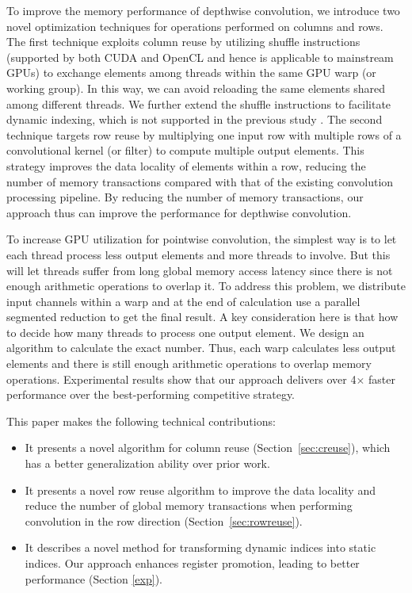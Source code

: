 To improve the memory performance of depthwise convolution, we introduce two novel optimization techniques for operations performed on columns and rows. 
The first technique exploits column reuse by utilizing shuffle instructions (supported by both CUDA and OpenCL and hence is applicable to mainstream GPUs) to exchange elements among threads within the same GPU warp (or working group). 
In this way, we can avoid reloading the same elements shared among different threads. 
We further extend the shuffle instructions to facilitate dynamic indexing, which is not supported in the previous study \cite{vasilache2014fast}. 
The second technique targets row reuse by multiplying one input row with multiple rows of a convolutional kernel (or filter) to compute multiple output elements. 
This strategy improves the data locality of elements within a row, reducing the number of memory transactions compared with that of the
existing convolution processing pipeline. 
By reducing the number of memory transactions, our approach thus can improve the performance for depthwise convolution.

To increase GPU utilization for pointwise convolution, the simplest way is to let each thread process less output elements and more threads to involve. 
But this will let threads suffer from long global memory access latency since there is not enough arithmetic operations to overlap it.
To address this problem, we distribute input channels within a warp and at the end of calculation use a parallel segmented reduction to get the final result. A key consideration here is that how to decide how many threads to process one output element. We design an algorithm to calculate the exact number. 
Thus, each warp calculates less output elements and there is still enough arithmetic operations to overlap memory operations. 
Experimental results show that our approach delivers over 4$\times$ faster performance over the best-performing competitive strategy.

This paper makes the following technical contributions:
\begin{itemize}
  \item It presents a novel algorithm for column reuse (Section~\ref{sec:creuse}), which has a better generalization
      ability over prior work.
  \item It presents a novel row reuse algorithm to improve the data locality and reduce the number of global memory transactions when
      performing convolution in the row direction (Section~\ref {sec:rowreuse}).
  \item It describes a novel method for transforming dynamic indices into static indices. Our approach enhances register promotion,
      leading to better performance (Section \ref{exp}).
\end{itemize}
